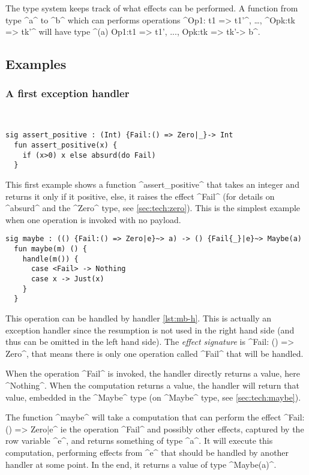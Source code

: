 \documentclass[nonacm=true, language=french, language=english]{acmart}
\begin{document}
The type system keeps track of what effects can be performed. A function from type ^a^ to ^b^ which can performs operations ^Op1: t1 => t1'^, \dots, ^Opk:tk => tk'^ will have type ^(a) {Op1:t1 => t1', ..., Opk:tk => tk'}-> b^.


\subsection{Examples}

\subsubsection{A first exception handler}
\label{sec:first-except-handl}

~

\begin{lstlisting}[caption=Fail invocation]
  sig assert_positive : (Int) {Fail:() => Zero|_}-> Int
  fun assert_positive(x) {
    if (x>0) x else absurd(do Fail)
  }
\end{lstlisting}

This first example shows a function ^assert_positive^ that takes an integer and returns it only if it positive, else, it raises the effect ^Fail^ (for details on ^absurd^ and the ^Zero^ type, see \ref{sec:tech:zero}). This is the simplest example when one operation is invoked with no payload.

\begin{lstlisting}[caption=maybe handler, label=lst:mb-h]
  sig maybe : (() {Fail:() => Zero|e}~> a) -> () {Fail{_}|e}~> Maybe(a)
  fun maybe(m) () {
    handle(m()) {
      case <Fail> -> Nothing
      case x -> Just(x)
    }
  }
\end{lstlisting}

This operation can be handled by handler \ref{lst:mb-h}. This is actually an exception handler since the resumption is not used in the right hand side (and thus can be omitted in the left hand side). The \emph{effect signature} is ^{Fail: () => Zero}^, that means there is only one operation called ^Fail^ that will be handled.

When the operation ^Fail^ is invoked, the handler directly returns a value, here ^Nothing^. When the computation returns a value, the handler will return that value, embedded in the ^Maybe^ type (on ^Maybe^ type, see \ref{sec:tech:maybe}).

The function ^maybe^ will take a computation that can perform the effect ^{Fail: () => Zero|e}^ ie the operation ^Fail^ and possibly other effects, captured by the row variable ^e^, and returns something of type ^a^. It will execute this computation, performing effects from ^e^ that should be handled by another handler at some point. In the end, it returns a value of type ^Maybe(a)^.
\end{document}
